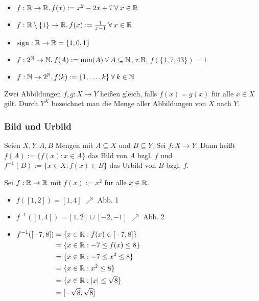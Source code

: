 \begin{itemize}
	\item $ f : \mathbb R \to \mathbb R,\\ f(x) := x^2 -2x + 7 \:\forall\: x \in \mathbb R $
	\item $ f : \mathbb R \setminus \{ 1 \} \to \mathbb R,\\ f(x) := \frac{1}{x-1} \:\forall\: x \in \mathbb R $
	\item $ \operatorname{sign}: \mathbb R \to \mathbb R = \{ 1,0,1 \} $
	\item $ f : 2^{\mathbb N} \to \mathbb N, f(A) := \min(A) \:\forall\: A \subseteq \mathbb N $, z.B. $ f( \{ 1,7,43 \} ) = 1 $
	\item $ f : \mathbb N \to 2^\mathbb N, f(k) := \{ 1,\ldots,k \} \:\forall\: k \in \mathbb N $
\end{itemize}

Zwei Abbildungen $ f,g : X \to Y $ heißen gleich, falls $ f(x) = g(x) $ für alle $ x \in X $ gilt. Durch $ Y^X $ bezeichnet man die Menge aller Abbildungen von $ X $ nach $ Y $.

\subsubsection{Bild und Urbild}

Seien $ X,Y,A,B $ Mengen mit $ A \subseteq X $ und $ B \subseteq Y $. Sei $ f : X \to Y $. Dann heißt $ f(A) := \{ f(x) : x \in A \} $ das Bild von $ A $ bzgl. $ f $ und $ f^{-1}(B) := \{ x \in X : f(x) \in B \} $ das Urbild von $ B $ bzgl. $ f $.

\begin{bsp}
	Sei $ f : \mathbb R \to \mathbb R $ mit $ f(x) := x^2 $ für alle $ x \in \mathbb R $.
	\begin{itemize}
		\item $ f( [1,2] ) = [1,4] $ $ \nearrow $ Abb. 1
		\item $ f^{-1}( [1,4] ) = [1,2] \cup [-2,-1] $ $ \nearrow $ Abb. 2
		\item
		$ \begin{aligned}[t]
			f^{-1}( [-7,8] ) &= \{ x \in \mathbb R : f(x) \in [-7,8] \} \\
			&= \{ x \in \mathbb R : -7 \leq f(x) \leq 8 \} \\
			&= \{ x \in \mathbb R : -7 \leq x^2 \leq 8 \} \\
			&= \{ x \in \mathbb R : x^2 \leq 8 \} \\
			&= \{ x \in \mathbb R : |x| \leq \sqrt{8} \} \\
			&= [-\sqrt{8},\sqrt{8}]
		\end{aligned} $
\end{itemize}
\end{bsp}

